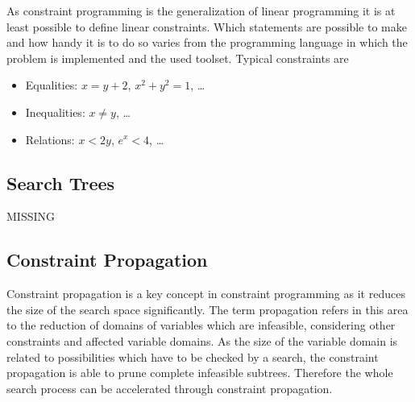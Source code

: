 \documentclass[10pt,
               a4paper,
               journal,
               ]{IEEEtran}
\begin{document}
	As constraint programming is the generalization of linear programming it is at least possible to define linear constraints. Which statements are possible to make and how handy it is to do so varies from the programming language in which the problem is implemented and the used toolset. Typical constraints are
	\begin{itemize}
		\item Equalities: $x = y + 2$, $x^2 + y^2 = 1$, \dots
		\item Inequalities: $x \ne y$, \dots
		\item Relations: $x < 2 y$, $e^x < 4$, \dots
	\end{itemize}
	
	\subsection{Search Trees}
	MISSING
	
	\subsection{Constraint Propagation}
	Constraint propagation is a key concept in constraint programming as it reduces the size of the search space significantly. The term propagation refers in this area to the reduction of domains of variables which are infeasible, considering other constraints and affected variable domains. As the size of the variable domain is related to possibilities which have to be checked by a search, the constraint propagation is able to prune complete infeasible subtrees. Therefore the whole search process can be accelerated through constraint propagation.
	
\end{document}
